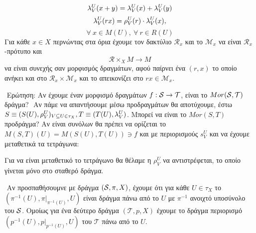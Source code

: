 $$\lambda^U_V (x+y) = \lambda^U_V (x) + \lambda^U_V(y)$$
$$\lambda^U_V (rx) = \rho^U_V (r) \cdot \lambda^U_V(x),$$
$$ \forall \ x \in M(U), \ \forall \ r \in R(U)$$ Για κάθε $x \in X$ περνώντας στα όρια έχουμε τον δακτύλιο $\mathcal{R}_x$ και το $\mathcal{M}_x$ να είναι $\mathcal{R}_x$-πρότυπο και 
$$\mathcal{R} \times_X M \longrightarrow M$$ να είναι συνεχής σαν μορφισμός δραγμάτων, αφού παίρνει ένα $(r,x)$ το οποίο ανήκει και στο $\mathcal{R}_x \times \mathcal{M}_x$ και το απεικονίζει στο $rx \in \mathcal{M}_x$.


$ $\newline
Ερώτηση: Αν έχουμε έναν μορφισμό δραγμάτων $f:\mathcal{S} \rightarrow \mathcal{T}$, είναι το $Mor(\mathcal{S},\mathcal{T})$ δράγμα?
$ $\newline
Αν πάμε να απαντήσουμε μέσω προδραγμάτων θα αποτύχουμε, έστω $S\equiv (S(U),\rho^U_V)_{V\subseteq U\in \tau_X}, T \equiv (T(U),\lambda^U_V)$. Μπορεί να είναι το $Mor(S,T)$ προδράγμα? Αν είναι συνόλων θα πρέπει να ορίζεται το $M(S,T)(U) = M(S(U),T(U)) \ni f$ και με περιορισμούς $s^U_V$ και να έχουμε μεταθετικά τα τετράγωνα:

\begin{figure}[H]
    \centering
\end{figure}

\noindent Για να είναι μεταθετικό το τετράγωνο θα θέλαμε η $\rho^U_V$ να αντιστρέφεται, το οποίο γίνεται μόνο στο σταθερό δράγμα.

$ $\newline
Αν προσπαθήσουμνε με δράγμα $(\mathcal{S}, \pi, X)$, έχουμε ότι για κάθε $U \in \tau_X$ το $(\pi^{-1}(U), \pi|_{\pi^{-1}(U)}, U)$ είναι δράγμα πάνω από το $U$ με $\pi^{-1}$ ανοιχτό υποσύνολο του $\mathcal{S}$. Ομοίως για ένα δεύτερο δράγμα $(\mathcal{T},p, X)$ έχουμε το δράγμα περιορισμό $(p^{-1}(U),p|_{p^{-1}(U)},U)$ του $\mathcal{T}$ πάνω από το $U$.

